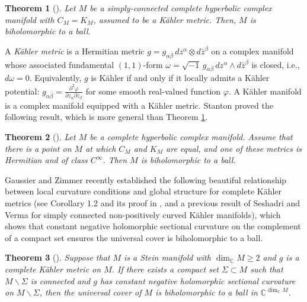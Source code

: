 \documentclass[12pt] {article}
\newtheorem{theorem}{Theorem}[section]
\numberwithin{equation}{section}
\begin{document}
\begin{theorem}[\cite{W}] 
\label{Theorem (B)}
Let $M$ be a simply-connected complete hyperbolic complex manifold with $C_M = K_M$, assumed to be a K\"ahler metric. Then, $M$ is biholomorphic to a ball.
\end{theorem}


A \emph{K\"ahler metric} is a Hermitian metric $g = g_{\alpha \bar \beta}\, dz^\alpha \otimes d\bar z^\beta$ on a complex manifold whose associated fundamental $(1,1)$-form $\omega = \sqrt{-1}\, g_{\alpha \bar \beta}\, dz^\alpha \wedge d\bar z^\beta$ is closed, i.e., $d\omega = 0$. Equivalently, $g$ is K\"ahler if and only if it locally admits a K\"ahler potential: $g_{\alpha \bar \beta} = \frac{\partial^2 \varphi}{\partial z_\alpha \partial \bar z_\beta}$ for some smooth real-valued function $\varphi$.  A K\"ahler manifold is a complex manifold equipped with a K\"ahler metric. Stanton proved the following result, which is more general than Theorem \ref{Theorem (B)}.

 
 

\begin{theorem}[\cite{Sta}] \label{Stanton}
Let $M$ be a complete hyperbolic complex manifold. Assume that there is a point on $M$ at which $C_M$ and $K_M$ are equal, and one of these metrics is Hermitian and of class $C^\infty$. Then $M$ is biholomorphic to a ball.
\end{theorem}


 
 
Gaussier and Zimmer recently established the following beautiful
relationship between local curvature conditions and global structure for complete K\"ahler metrics (see Corollary 1.2 and its proof in \cite{GZ}, and a previous result of Seshadri and Verma \cite{SeV} for simply connected non-positively curved K\"ahler manifolds), which   shows that constant negative holomorphic sectional curvature on the complement of a compact set ensures the universal cover is biholomorphic to a ball. 
 
  
\begin{theorem}[\cite{GZ}] \label{universal_cover_is_a_ball}
Suppose that $M$ is a Stein manifold with $\dim_{\mathbb{C}} M \geq 2$ and $g$ is a complete K\"ahler metric on $M$. If there exists a compact set $\Sigma \subset M$ such that $M \backslash \Sigma$ is connected and $g$ has constant negative holomorphic sectional curvature on $M \backslash \Sigma$, then
  the universal cover of $M$ is biholomorphic to a ball in $\mathbb{C}^{\dim_{\mathbb{C}} M}$.
\end{theorem}
\end{document}
